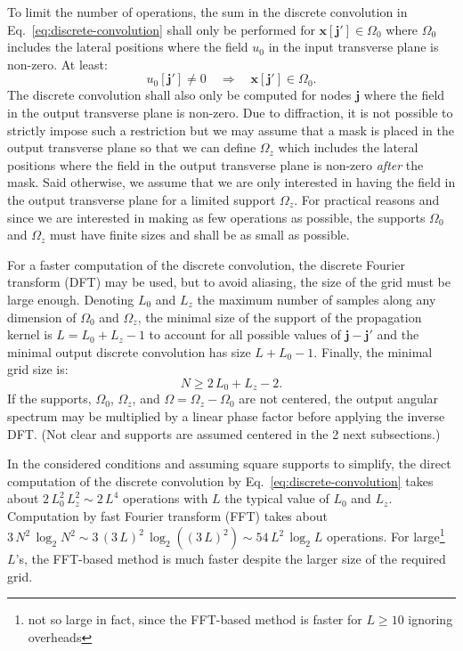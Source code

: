 \documentclass[a4paper]{article}
\newcommand{\oops}[1]{{\color{purple}#1}}
\newcommand{\V}[1]{\boldsymbol{#1}}
\newcommand*{\Set}[1]{\mathbb{#1}}
\begin{document}
To limit the number of operations, the sum in the discrete convolution in
Eq.~\eqref{eq:discrete-convolution} shall only be performed for
$\V{x}[\V{j}'] \in Ω_{0}$ where $Ω_{0}$ includes the lateral positions where
the field $u_{0}$ in the input transverse plane is non-zero. At least:
\begin{equation}
  \label{eq:input-field-support}
  u_{0}[\V{j}']
  \not= 0
  \quad\Longrightarrow\quad
  \V{x}[\V{j}'] \in Ω_{0}.
\end{equation}
The discrete convolution shall also only be computed for nodes $\V{j}$ where
the field in the output transverse plane is non-zero. Due to diffraction, it is
not possible to strictly impose such a restriction but we may assume that a
mask is placed in the output transverse plane so that we can define $Ω_{z}$
which includes the lateral positions where the field in the output transverse
plane is non-zero \emph{after} the mask. Said otherwise, we assume that we are
only interested in having the field in the output transverse plane for a
limited support $Ω_{z}$. For practical reasons and since we are interested in
making as few operations as possible, the supports $Ω_{0}$ and $Ω_{z}$ must
have finite sizes and shall be as small as possible.

For a faster computation of the discrete convolution, the discrete Fourier
transform (DFT) may be used, but to avoid aliasing, the size of the grid must
be large enough. Denoting $L_{0}$ and $L_{z}$ the maximum number of samples
along any dimension of $Ω_{0}$ and $Ω_{z}$, the minimal size of the support of
the propagation kernel is $L = L_{0} + L_{z} - 1$ to account for all possible
values of $\V{j} - \V{j}'$ and the minimal output discrete convolution has size
$L + L_{0} - 1$. Finally, the minimal grid size is:
\begin{equation}
  \label{eq:convolution-grid-size}
  N ≥ 2\,L_{0} + L_{z} - 2.
\end{equation}
If the supports, $Ω_{0}$, $Ω_{z}$, and $Ω = Ω_{z} - Ω_{0}$ are not centered,
the output angular spectrum may be multiplied by a linear phase factor before
applying the inverse DFT. \oops{(Not clear and supports are assumed centered in
  the 2 next subsections.)}

In the considered conditions and assuming square supports to simplify, the
direct computation of the discrete convolution by
Eq.~\eqref{eq:discrete-convolution} takes about
$2\,L_{0}^{2}\,L_{z}^{2} \sim 2\,L^{4}$ operations with $L$ the typical
value of $L_{0}$ and $L_{z}$. Computation by fast Fourier transform (FFT) takes
about $3\,N^{2}\,\log_{2}N^{2} \sim 3\,(3\,L)^{2}\,\log_{2}((3\,L)^{2}) \sim 54\,L^{2}\,\log_{2}L$
operations. For large\footnote{not so large in fact, since the FFT-based method
  is faster for $L ≥ 10$ ignoring overheads} $L$'s, the FFT-based method is
much faster despite the larger size of the required grid.
\end{document}

